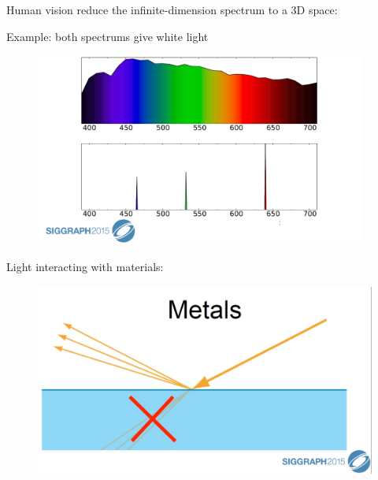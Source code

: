 \documentclass[]{beamer}
\begin{document}
   \begin{frame}


    \textcolor{mypink1}{Human vision reduce the infinite-dimension spectrum to a 3D space:}
    \pause

    \vspace{5mm}
    Example: both spectrums give white light
    
    \begin{figure}[h!]
      \begin{center}
        \includegraphics[height=2.5in]{images/3.jpg}
      \end{center}
    \end{figure}
  \end{frame}
    

   \begin{frame}


    \textcolor{mypink1}{Light interacting with materials:}
    \pause


    
    \begin{figure}[h!]
      \begin{center}
        \includegraphics[height=2.5in]{images/4.jpg}
      \end{center}
    \end{figure}
  \end{frame}
    
\end{document}
